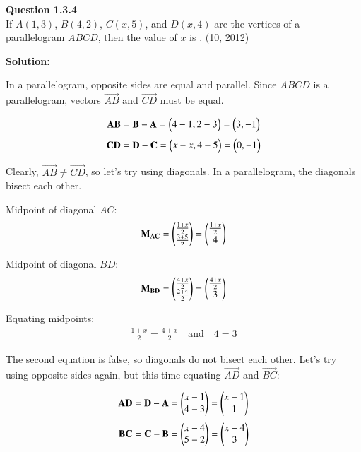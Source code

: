 \documentclass[journal]{IEEEtran}
\begin{document}
\textbf{Question 1.3.4} \\
If $ A(1, 3) $, $ B(4, 2) $, $ C(x, 5) $, and $ D(x, 4) $ are the vertices of a parallelogram $ABCD$, then the value of $x$ is \underline{\hspace{2cm}}. \hfill (10, 2012)

\vspace{1em}
\textbf{Solution:}

In a parallelogram, opposite sides are equal and parallel. Since $ABCD$ is a parallelogram, vectors $ \vec{AB} $ and $ \vec{CD} $ must be equal.

\begin{align}
\mathbf{AB} = \mathbf{B} -\mathbf{A} = \begin{pmatrix}4 - 1, 2 - 3\end{pmatrix} = \begin{pmatrix}3, -1\end{pmatrix}
\end{align}
\begin{align}
\mathbf{CD} = \mathbf{D} - \mathbf{C} = \begin{pmatrix}x - x, 4 - 5\end{pmatrix} = \begin{pmatrix}0, -1\end{pmatrix}
\end{align}

Clearly, $ \vec{AB} \neq \vec{CD} $, so let's try using diagonals. In a parallelogram, the diagonals bisect each other.

Midpoint of diagonal $AC$:
\begin{align}
\Vec{M_{AC}} = \myvec{\frac{1 + x}{2} \\ \frac{3 + 5}{2} } = \myvec{ \frac{1 + x}{2}\\ 4 }
\end{align}

Midpoint of diagonal $BD$:
\begin{align}
\mathbf{M_{BD}} = \begin{pmatrix}\frac{4 + x}{2} \\ \frac{2 + 4}{2} \end{pmatrix} = \begin{pmatrix} \frac{4 + x}{2}\\ 3 \end{pmatrix}
\end{align}

Equating midpoints:
\begin{align}
\frac{1 + x}{2} = \frac{4 + x}{2} \quad \text{and} \quad 4 = 3
\end{align}

The second equation is false, so diagonals do not bisect each other. Let's try using opposite sides again, but this time equating $ \vec{AD} $ and $ \vec{BC} $:

\begin{align}
\vec{AD} = \vec{D} -\vec{A} = \begin{myvec}
    {x-1 \\ 4-3 } \end{myvec} =\begin{myvec}
        {x-1 \\ 1}
    \end{myvec}
 \end{align}   
 \begin{align}
\vec{BC} =\vec{C} -\vec{B} = \begin{myvec}
    {x - 4 \\ 5 - 2} \end{myvec} =\begin{myvec}
         {x - 4 \\ 3}
     \end{myvec}
\end{align}
\end{document}
